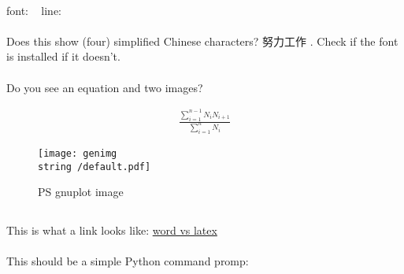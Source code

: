 \documentclass[a4paper,UTF8]{article}
\newcommand{\cn}[1]{{\setmainfont{WenQuanYi Zen Hei} #1 }} %
\begin{document}
			\paragraph{}
				font: \fontname\font\ \the\fontdimen6\font
				line: \prntlen{\textwidth} \prntlen{\linewidth}
			\paragraph{}
				Does this show (four) simplified Chinese characters? \cn{努力工作}. Check if the font is installed if it doesn't.
			\paragraph{}
				Do you see an equation and two images?

		\begin{align}
			\frac{\sum_{i=1}^{n-1}N_{i}N_{i+1}}{\sum_{i=1}^{n} N_{i}}
			\label{eq:equation_label}
		\end{align}


		
		\begin{figure}[htbp]
			\centering
			\texttt{[image: genimg\\string~/default.pdf]}
			\caption{PS gnuplot image}
			\label{yolo}
		\end{figure}
		
		\subsection{}
			\paragraph{}
				This is what a link looks like: \href{http://tex.stackexchange.com/questions/120154/is-latex-nowadays-still-that-superior-to-word}{word vs latex}
			\paragraph{}
				This should be a simple Python command promp:
			\paragraph{}
\end{document}

